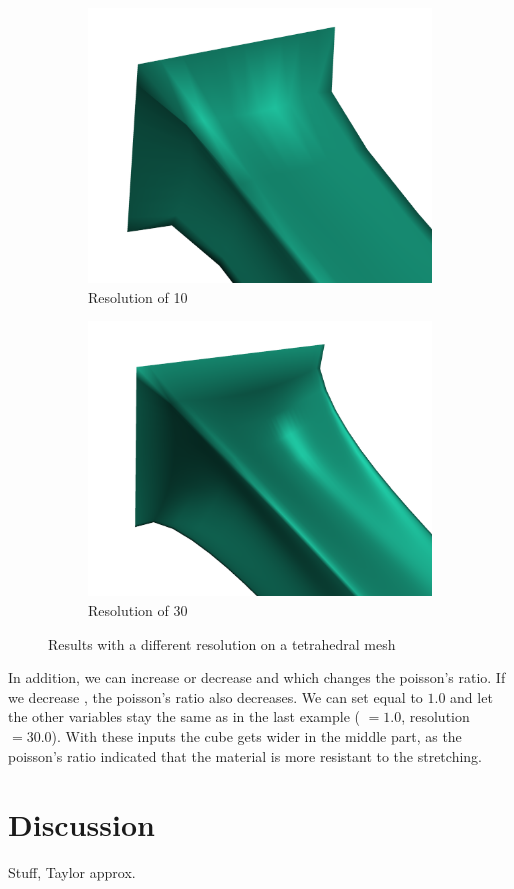 \begin{figure}[!ht]
\centering
\begin{subfigure}{.47\textwidth}
  \centering
  \includegraphics[width=.8\linewidth]{resources/default_zoom_tet.png}  
  \caption{Resolution of 10}
  \label{fig:res_1}
\end{subfigure}
\begin{subfigure}{.47\textwidth}
  \centering
  \includegraphics[width=.8\linewidth]{resources/res_zoom_tet.png}  
  \caption{Resolution of 30}
  \label{fig:res_2}
\end{subfigure}
\caption{Results with a different resolution on a tetrahedral mesh}
\label{fig:res}
\end{figure}


In addition, we can increase or decrease \textit{\mu} and \textit{\lambda} which changes the poisson's ratio. If we decrease \textit{\lambda}, the poisson's ratio also decreases. We can set \textit{\lambda} equal to $1.0$ and let the other variables stay the same as in the last example (\textit{\mu} $= 1.0$, resolution $= 30.0$). With these inputs the cube gets wider in the middle part, as the poisson's ratio indicated that the material is more resistant to the stretching.





\newpage

\section{Discussion}
Stuff, Taylor approx.



